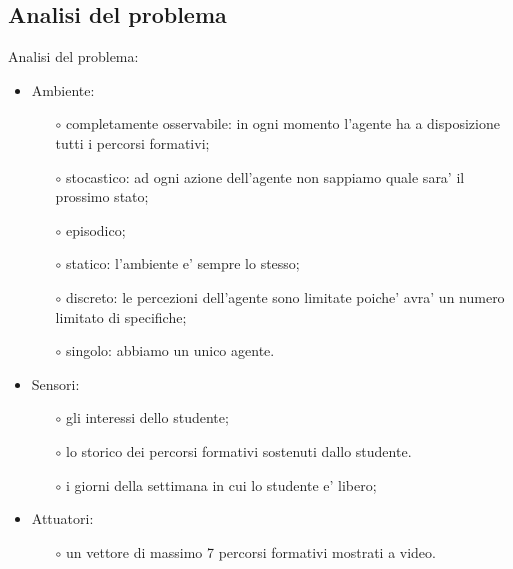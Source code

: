 \documentclass[10pt,a4paper]{article}
\begin{document}
    \subsection{Analisi del problema}
      \label{analisiDelProblemaSubsection}
      Analisi del problema:\\
      \begin{itemize}
        \item Ambiente:
        \begin{itemize}
          \item[$\circ$] completamente osservabile: in ogni momento l'agente ha a disposizione tutti i percorsi formativi;
          \item[$\circ$] stocastico: ad ogni azione dell'agente non sappiamo quale sara' il prossimo stato;
          \item[$\circ$] episodico;
          \item[$\circ$] statico: l'ambiente e' sempre lo stesso;
          \item[$\circ$] discreto: le percezioni dell'agente sono limitate poiche' avra' un numero limitato di specifiche;
          \item[$\circ$] singolo: abbiamo un unico agente.
        \end{itemize}
        
        \item Sensori:
        \begin{itemize}
          \item[$\circ$] gli interessi dello studente;
          \item[$\circ$] lo storico dei percorsi formativi sostenuti dallo studente.
          \item[$\circ$] i giorni della settimana in cui lo studente e' libero;
        \end{itemize}
        
        \item Attuatori:
        \begin{itemize}
          \item[$\circ$] un vettore di massimo 7 percorsi formativi mostrati a video.
        \end{itemize}
      \end{itemize}%
        
\end{document}
